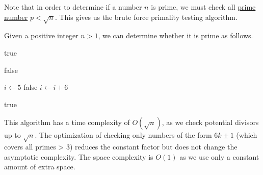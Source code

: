   Note that in order to determine if a number $n$ is prime, we must check all \hyperref[nt-def:prime-number]{prime number} $p < \sqrt{n}$. This gives us the brute force primality testing algorithm. 

  \begin{algo}
    Given a positive integer $n > 1$, we can determine whether it is prime as follows.
    \begin{algorithmic}[1]
       
         
          \State \Return true
        \EndIf
        
         
          \State \Return false
        \EndIf
        
        \State $i \gets 5$ 
         
           
            \State \Return false 
          \EndIf
          \State $i \gets i + 6$ 
        \EndWhile
        
        \State \Return true 
      \EndProcedure
    \end{algorithmic}
    This algorithm has a time complexity of $O(\sqrt{n})$, as we check potential divisors up to $\sqrt{n}$. The optimization of checking only numbers of the form $6k \pm 1$ (which covers all primes > 3) reduces the constant factor but does not change the asymptotic complexity. The space complexity is $O(1)$ as we use only a constant amount of extra space.
  \end{algo}

